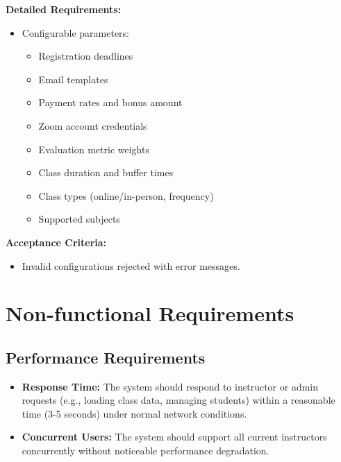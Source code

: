 \textbf{Detailed Requirements:}
\begin{itemize}
    \item Configurable parameters:
    \begin{itemize}
        \item Registration deadlines
        \item Email templates
        \item Payment rates and bonus amount
        \item Zoom account credentials
        \item Evaluation metric weights
        \item Class duration and buffer times
        \item Class types (online/in-person, frequency)
        \item Supported subjects
    \end{itemize}
\end{itemize}

\textbf{Acceptance Criteria:}
\begin{itemize}
    \item Invalid configurations rejected with error messages.
\end{itemize}



\section{Non-functional Requirements}

\subsection{Performance Requirements}
\begin{itemize}
    \item \textbf{Response Time:} The system should respond to instructor or admin requests (e.g., loading class data, managing students) within a reasonable time (3-5 seconds) under normal network conditions.
    \item \textbf{Concurrent Users:} The system should support all current instructors concurrently without noticeable performance degradation.
\end{itemize}

